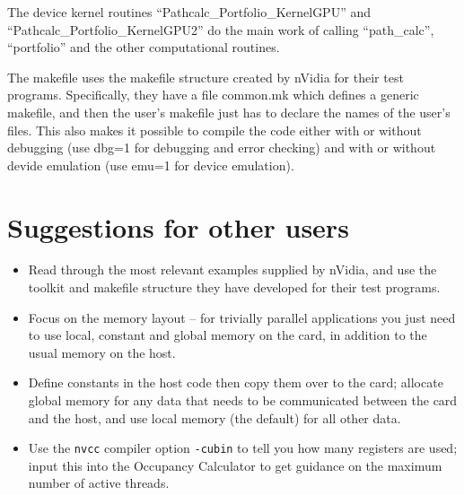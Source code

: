 \documentclass[12pt]{article}
\begin{document}
The device kernel routines ``Pathcalc\_Portfolio\_KernelGPU'' and  
``Pathcalc\_Portfolio\_KernelGPU2'' do the main work of calling 
``path\_calc'', ``portfolio'' and the other computational routines.

The makefile uses the makefile structure created by nVidia for their 
test programs.  Specifically, they have a file common.mk which defines 
a generic makefile, and then the user's makefile just has to declare 
the names of the user's files.  This also makes it possible to compile 
the code either with or without debugging (use dbg=1 for debugging and 
error checking) and with or without devide emulation (use emu=1 for 
device emulation).


\section{Suggestions for other users}

\begin{itemize}
\item
Read through the most relevant examples supplied by nVidia, and use the 
toolkit and makefile structure they have developed for their test programs.

\item
Focus on the memory layout -- for trivially parallel applications you just 
need to use local, constant and global memory on the card, in addition to 
the usual memory on the host.

\item
Define constants in the host code then copy them over to the card; 
allocate global memory for any data that needs to be communicated 
between the card and the host, and use local memory (the default) 
for all other data.

\item
Use the {\tt nvcc} compiler option {\tt -cubin} to tell you how many 
registers are used; input this into the Occupancy Calculator to get 
guidance on the maximum number of active threads.


\end{itemize}
\end{document}
